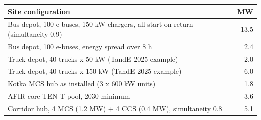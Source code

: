 \begin{tabular}{@{}lr@{}}
\toprule
Site configuration & MW \\
\midrule
Bus depot, 100 e-buses, 150 kW chargers, all start on return (simultaneity 0.9) & 13.5 \\
Bus depot, 100 e-buses, energy spread over 8 h & 2.4 \\
Truck depot, 40 trucks x 50 kW (TandE 2025 example) & 2.0 \\
Truck depot, 40 trucks x 150 kW (TandE 2025 example) & 6.0 \\
Kotka MCS hub as installed (3 x 600 kW units) & 1.8 \\
AFIR core TEN-T pool, 2030 minimum & 3.6 \\
Corridor hub, 4 MCS (1.2 MW) + 4 CCS (0.4 MW), simultaneity 0.8 & 5.1 \\
\bottomrule
\end{tabular}
